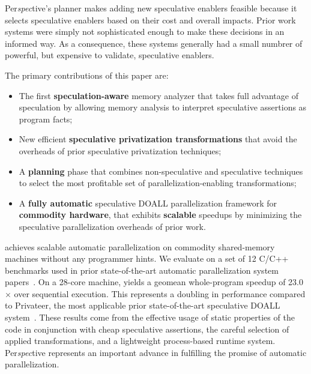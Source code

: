 Per{\em spec}tive's planner makes adding new speculative enablers
feasible because it selects speculative enablers based on their cost
and overall impacts.  Prior work systems were simply not sophisticated
enough to make these decisions in an informed way.  As a consequence,
these systems generally had a small numbrer of powerful, but expensive
to validate, speculative enablers.

The primary contributions of this paper are:
\begin{itemize}

\item The first \textbf{speculation-aware} memory analyzer that takes
  full advantage of speculation by allowing memory analysis to
  interpret speculative assertions as program facts;

\item New efficient \textbf{speculative privatization transformations}
that avoid the overheads of prior speculative privatization
techniques;

\item A \textbf{planning} phase that combines non-speculative
and speculative techniques to select the most profitable set of
parallelization-enabling transformations;

\item A \textbf{fully automatic} speculative DOALL parallelization
framework for \textbf{commodity hardware}, that exhibits
\textbf{scalable} speedups by minimizing the speculative
parallelization overheads of prior work.

\end{itemize}

\name achieves scalable automatic parallelization on commodity
shared-memory machines without any programmer hints.  We evaluate
\name on a set of 12 C/C++ benchmarks used in prior state-of-the-art
automatic parallelization system
papers~\cite{johnson:12:pldi,kim:12:cgo,simone:12:cgo}. On a 28-core
machine, \name yields a geomean whole-program speedup of 23.0$\times$
over sequential execution.  This represents a doubling in performance
compared to Privateer, the most applicable prior state-of-the-art
speculative DOALL system~\cite{johnson:12:pldi}.  These results come
from the effective usage of static properties of the code in
conjunction with cheap speculative assertions, the careful selection
of applied transformations, and a lightweight process-based runtime
system.  Per{\em spec}tive represents an important advance in
fulfilling the promise of automatic parallelization.



